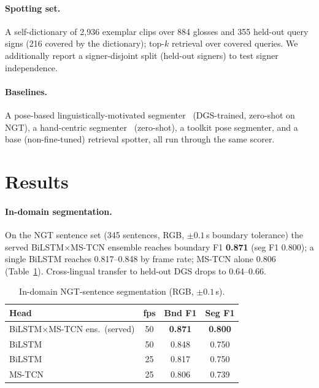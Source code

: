 \documentclass[10pt,twocolumn]{article}
\begin{document}
\paragraph{Spotting set.} A self-dictionary of 2{,}936 exemplar clips over 884 glosses and 355
held-out query signs (216 covered by the dictionary); top-$k$ retrieval over covered queries. We
additionally report a signer-disjoint split (held-out signers) to test signer independence.
\paragraph{Baselines.} A pose-based linguistically-motivated segmenter~\cite{moryossef2023}
(DGS-trained, zero-shot on NGT), a hand-centric segmenter~\cite{handson} (zero-shot), a toolkit
pose segmenter, and a base (non-fine-tuned) retrieval spotter, all run through the same scorer.

\section{Results}
\paragraph{In-domain segmentation.} On the NGT sentence set (345 sentences, RGB, $\pm0.1$\,s
boundary tolerance) the served BiLSTM$\times$MS-TCN ensemble reaches boundary F1 \textbf{0.871}
(seg F1 0.800); a single BiLSTM reaches 0.817--0.848 by frame rate; MS-TCN alone 0.806
(Table~\ref{tab:seg-indomain}). Cross-lingual transfer to held-out DGS drops to 0.64--0.66.

\begin{table}[t]\centering\small
\caption{In-domain NGT-sentence segmentation (RGB, $\pm0.1$\,s).}
\label{tab:seg-indomain}
\begin{tabular}{lccc}\toprule
Head & fps & Bnd F1 & Seg F1\\\midrule
BiLSTM$\times$MS-TCN ens.\ (served) & 50 & \textbf{0.871} & \textbf{0.800}\\
BiLSTM & 50 & 0.848 & 0.750\\
BiLSTM & 25 & 0.817 & 0.750\\
MS-TCN & 25 & 0.806 & 0.739\\\bottomrule
\end{tabular}
\end{table}
\end{document}
